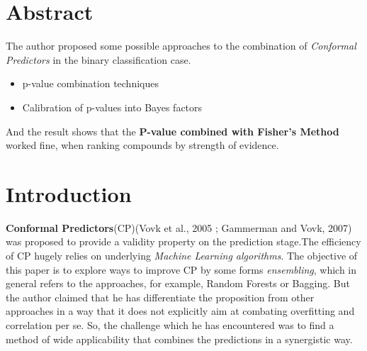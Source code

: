 \documentclass[10pt,a4paper]{article}
\begin{document}
\section{Abstract}
The author proposed some possible approaches to the combination of \textit{Conformal Predictors} in the binary classification case.
\begin{itemize}
    \item p-value combination techniques
    \item Calibration of p-values into Bayes factors
\end{itemize}
And the result shows that the \textbf{P-value combined with Fisher's Method} worked fine, when ranking compounds by strength of evidence.

\section{Introduction}
\textbf{Conformal Predictors}(CP)(Vovk et al., 2005 \cite{vovk2005conformal}; Gammerman and Vovk, 2007\cite{gammerman2007hedging}) was proposed to provide a validity property on the prediction stage.The efficiency of CP hugely relies on underlying \textit{Machine Learning algorithms}. The objective of this paper is to explore ways to improve CP by some forms \textit{ensembling}, which in general refers to the approaches, for example, Random Forests or Bagging. But the author claimed that he has differentiate the proposition from other approaches in a way that it does not explicitly aim at combating overfitting and correlation per se. So, the challenge which he has encountered was to find a method of wide applicability that combines the predictions in a synergistic way.
\end{document}

